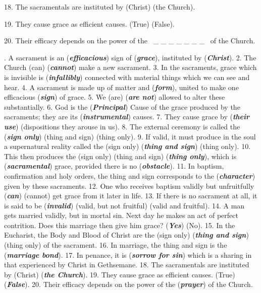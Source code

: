 \documentclass[a4paper]{article}
\begin{document}
18. The sacramentals are instituted by (Christ) (the Church).

19. They cause grace as efficient causes. (True) (False).

20. Their efficacy depends on the power of the \ \_ \_ \_ \_ \_ \_ \_ \ of the Church. 


\bigskip

. A sacrament is an (\textbf{\textit{efficacious}}) sign of (\textbf{\textit{grace}}), instituted by (\textbf{\textit{Christ}}). 2. The Church (can) (\textbf{\textit{cannot}}) make a new sacrament. 3. In the sacraments, grace which is invisible is (\textbf{\textit{infallibly}}) connected with material things which we can see and hear. 4. A sacrament is made up of matter and (\textbf{\textit{form}}), united to make one efficacious (\textbf{\textit{sign}}) of grace. 5. We (are) (\textbf{\textit{are not}}) allowed to alter these substantially. 6. God is the (\textbf{\textit{Principal}}) Cause of the grace produced by the sacraments; they are its (\textbf{\textit{instrumental}}) causes. 7. They cause grace by (\textbf{\textit{their use}}) (dispositions they arouse in us). 8. The external ceremony is called the (\textbf{\textit{sign only}}) (thing and sign) (thing only). 9. If valid, it must produce in the soul a supernatural reality called the (sign only) (\textbf{\textit{thing and sign}}) (thing only). 10. This then produces the (sign only) (thing and sign) (\textbf{\textit{thing only}}), which is (\textbf{\textit{sacramental}}) grace, provided there is no (\textbf{\textit{obstacle}}). 11. In baptism, confirmation and holy orders, the thing and sign corresponds to the (\textbf{\textit{character}}) given by these sacraments. 12. One who receives baptism validly but unfruitfully (\textbf{\textit{can}}) (cannot) get grace from it later in life. 13. If there is no sacrament at all, it is said to be (\textbf{\textit{invalid}}) (valid, but not fruitful) (valid and fruitful). 14. A man gets married validly, but in mortal sin. Next day he makes an act of perfect contrition. Does this marriage then give him grace? (\textbf{\textit{Yes}}) (No). 15. In the Eucharist, the Body and Blood of Christ are the (sign only) (\textbf{\textit{thing and sign}}) (thing only) of the sacrament. 16. In marriage, the thing and sign is the (\textbf{\textit{marriage bond}}). 17. In penance, it is (\textbf{\textit{sorrow for sin}}) which is a sharing in that experienced by Christ in Gethsemane. 18. The sacramentals are instituted by (Christ) (\textbf{\textit{the Church}}). 19. They cause grace as efficient causes. (True) (\textbf{\textit{False}}). 20. Their efficacy depends on the power of the (\textbf{\textit{prayer}}) of the Church. 
\end{document}
